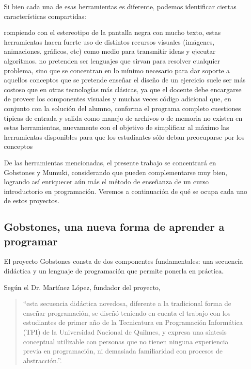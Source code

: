 Si bien cada una de esas herramientas es diferente, podemos identificar ciertas características compartidas:
\begin{itemize}
   rompiendo con el estereotipo de la pantalla negra con mucho texto, estas herramientas hacen fuerte uso de distintos recursos visuales (imágenes, animaciones, gráficos, etc) como medio para transmitir ideas y ejecutar algoritmos.
   no pretenden ser lenguajes que sirvan para resolver cualquier problema, sino que se concentran en lo mínimo necesario para dar soporte a aquellos conceptos que se pretende enseñar
   el diseño de un ejercicio suele ser más costoso que en otras tecnologías más clásicas, ya que el docente debe encargarse de proveer los componentes visuales y muchas veces código adicional que, en conjunto con la solución del alumno, conforma el programa completo
   cuestiones típicas de entrada y salida como manejo de archivos o de memoria no existen en estas herramientas, nuevamente con el objetivo de simplificar al máximo las herramientas disponibles para que los estudiantes sólo deban preocuparse por los conceptos
\end{itemize}

De las herramientas mencionadas, el presente trabajo se concentrará en Gobstones y Mumuki, considerando que pueden complementarse muy bien, logrando así enriquecer aún más el método de enseñanza de un curso introductorio en programación. Veremos a continuación de qué se ocupa cada uno de estos proyectos.

\subsection{Gobstones, una nueva forma de aprender a programar}
El proyecto Gobstones consta de dos componentes fundamentales: una secuencia didáctica y un lenguaje de programación que permite ponerla en práctica.

Según el Dr. Martínez López, fundador del proyecto,

\begin{quote}
``esta secuencia didáctica novedosa, diferente a la tradicional forma de enseñar programación, se diseñó teniendo en cuenta el trabajo con los estudiantes de primer año de la Tecnicatura en Programación Informática (TPI) de la Universidad Nacional de Quilmes, y expresa una síntesis conceptual utilizable con personas que no tienen ninguna experiencia previa en programación, ni demasiada familiaridad con procesos de abstracción.''\cite{LibroGobstones}.
\end{quote}

